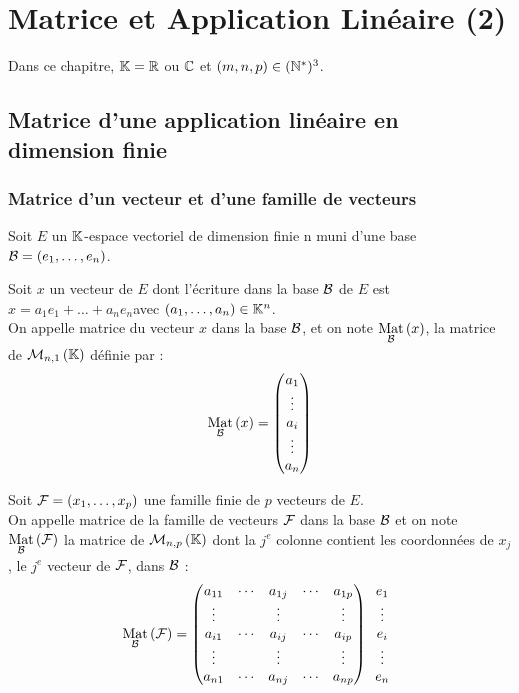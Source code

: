 \chapter{Matrice et Application Linéaire (2)}

\minitoc
Dans ce chapitre, \(\K = \R\) ou \(\C\) et \((m, n, p) \in (\Ns)^3\).

\section{Matrice d’une application linéaire en dimension finie}
\subsection{Matrice d’un vecteur et d’une famille de vecteurs}
Soit \(E\) un \(\K\)-espace vectoriel de dimension finie n muni d’une base \(\cal{B} = (e_1, \dots , e_n)\).
\begin{defprop}
Soit \(x\) un vecteur de \(E\) dont l’écriture dans la base \(\cal{B}\) de \(E\) est \(x = a_1e_1 +\dots+a_ne_n \)avec \((a_1, \dots , a_n) \in \K^n\).\\
On appelle matrice du vecteur \(x\) dans la base \(\cal{B}\), et on note \(\Mat{\cal{B}}{x}\), la matrice de \(\M{n,1}\) définie par :
\[\Mat{\cal{B}}{x}=
\begin{pmatrix}
a_{1} \\
\vdots \\
a_{i} \\
\vdots \\
a_{n}
\end{pmatrix}\]
\end{defprop}

\begin{defprop}
    
Soit \(\cal{F} = (x_1, \dots , x_p)\) une famille finie de \(p\) vecteurs de \(E\).\\
On appelle matrice de la famille de vecteurs \(\cal{F}\) dans la base \(\cal{B}\) et on note \(\Mat{\cal{B}}{\cal{F}}\) la matrice de \(\M{n,p}\) dont la \(j^e\) colonne contient les coordonnées de \(x_j\), le \(j^e\) vecteur de \(\cal{F}\), dans \(\cal{B}\) :
\[\Mat{\cal{B}}{\cal{F}} =
\begin{pmatrix}
a_{11} & \cdots & a_{1j} & \cdots & a_{1p} \\
\vdots &        & \vdots &        & \vdots \\
a_{i1} & \cdots & a_{ij} & \cdots & a_{ip} \\
\vdots &        & \vdots &        & \vdots \\
a_{n1} & \cdots & a_{nj} & \cdots & a_{np}
\end{pmatrix}
\begin{array}{c}
    e_1 \\
    \vdots \\
    e_i \\
    \vdots \\
    e_n
\end{array}
\]
\end{defprop}


